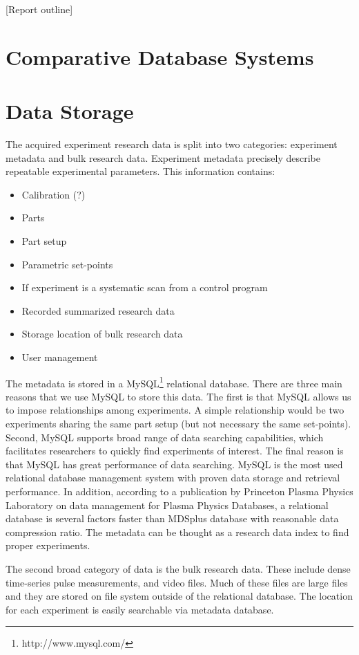 \documentclass{sig-alternate}
\begin{document}
[Report outline]


\section{Comparative Database Systems}


\section{Data Storage}

The acquired experiment research data is split into two categories: experiment metadata and bulk research data. Experiment metadata precisely describe repeatable experimental parameters. This information contains:

\begin{itemize}
\item Calibration (?)
\item Parts
\item Part setup
\item Parametric set-points
\item If experiment is a systematic scan from a control program
\item Recorded summarized research data
\item Storage location of bulk research data
\item User management
\end{itemize}

The metadata is stored in a MySQL\footnote{http://www.mysql.com/} relational database. There are three main reasons that we use MySQL to store this data. The first is that MySQL allows us to impose relationships among experiments. A simple relationship would be two experiments sharing the same part setup (but not necessary the same set-points). Second, MySQL supports broad range of data searching capabilities, which facilitates researchers to quickly find experiments of interest. The final reason is that MySQL has great performance of data searching.  MySQL is the most used relational database management system with proven data storage and retrieval performance. In addition, according to a publication by Princeton Plasma Physics Laboratory on data management for Plasma Physics Databases\cite{Davis2004183}, a relational database is several factors faster than MDSplus\cite{4994733} database with reasonable data compression ratio. The metadata can be thought as a research data index to find proper experiments.

The second broad category of data is the bulk research data. These include dense time-series pulse measurements, and video files. Much of these files are large files and they are stored on file system outside of the relational database. The location for each experiment is easily searchable via metadata database.
\end{document}
